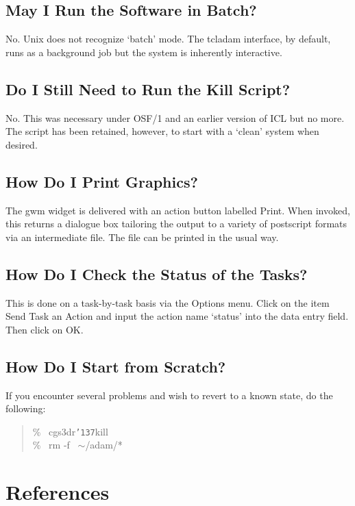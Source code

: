 \documentclass[a4paper]{book}
\newcommand{\stardocinitials}  {SUN}
\newcommand{\stardocnumber}    {206.1}
\newcommand{\stardocname}{\stardocinitials /\stardocnumber}
\renewcommand{\_}{{\tt\char'137}}
\begin{document}
\section{May I Run the Software in Batch?}
No. Unix does not recognize `batch' mode. The {\sc tcladam} interface, by default,
runs as a background job but the system is inherently interactive.

\section{Do I Still Need to Run the Kill Script?}
No. This was necessary under OSF/1 and an earlier version of ICL but no more. The
script has been retained, however, to start with a `clean' system when desired.

\section{How Do I Print Graphics?}
The {\sc gwm} widget is delivered with an action button labelled {\sf Print}. When
invoked, this returns a dialogue box tailoring the output to a variety of postscript
formats via an intermediate file. The file can be printed in the usual way.

\section{How Do I Check the Status of the Tasks?}
This is done on a task-by-task basis via the {\sf Options}
menu. Click on the item {\sf Send Task an Action} and input the action name `status'
into the data entry field. Then click on {\sf OK}.

\section{How Do I Start from Scratch?}
\label{restart}
If you encounter several problems and wish to revert to a known state, do the following:

\begin{quote}
  \% \ cgs3dr\_kill \\
  \% \ rm -f \ $\sim$/adam/* \\
\end{quote}

\chapter*{References}
\markboth{References}{\stardocname}
\end{document}
